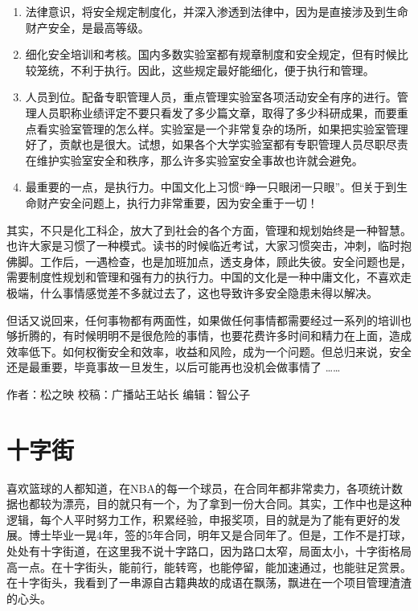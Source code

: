 \documentclass[
]{book}
\begin{document}
\begin{enumerate}
\def\labelenumi{\arabic{enumi}.}
\item
  法律意识，将安全规定制度化，并深入渗透到法律中，因为是直接涉及到生命财产安全，是最高等级。
\item
  细化安全培训和考核。国内多数实验室都有规章制度和安全规定，但有时候比较笼统，不利于执行。因此，这些规定最好能细化，便于执行和管理。
\item
  人员到位。配备专职管理人员，重点管理实验室各项活动安全有序的进行。管理人员职称业绩评定不要只看发了多少篇文章，取得了多少科研成果，而要重点看实验室管理的怎么样。实验室是一个非常复杂的场所，如果把实验室管理好了，贡献也是很大。试想，如果各个大学实验室都有专职管理人员尽职尽责在维护实验室安全和秩序，那么许多实验室安全事故也许就会避免。
\item
  最重要的一点，是执行力。中国文化上习惯``睁一只眼闭一只眼''。但关于到生命财产安全问题上，执行力非常重要，因为安全重于一切！
\end{enumerate}

其实，不只是化工科企，放大了到社会的各个方面，管理和规划始终是一种智慧。也许大家是习惯了一种模式。读书的时候临近考试，大家习惯突击，冲刺，临时抱佛脚。工作后，一遇检查，也是加班加点，透支身体，顾此失彼。安全问题也是，需要制度性规划和管理和强有力的执行力。中国的文化是一种中庸文化，不喜欢走极端，什么事情感觉差不多就过去了，这也导致许多安全隐患未得以解决。

但话又说回来，任何事物都有两面性，如果做任何事情都需要经过一系列的培训也够折腾的，有时候明明不是很危险的事情，也要花费许多时间和精力在上面，造成效率低下。如何权衡安全和效率，收益和风险，成为一个问题。但总归来说，安全还是最重要，毕竟事故一旦发生，以后可能再也没机会做事情了 \ldots\ldots{}

作者：松之映
校稿：广播站王站长
编辑：智公子

\hypertarget{ux5341ux5b57ux8857}{%
\section{十字街}\label{ux5341ux5b57ux8857}}

喜欢篮球的人都知道，在NBA的每一个球员，在合同年都非常卖力，各项统计数据也都较为漂亮，目的就只有一个，为了拿到一份大合同。其实，工作中也是这种逻辑，每个人平时努力工作，积累经验，申报奖项，目的就是为了能有更好的发展。博士毕业一晃4年，签的5年合同，明年又是合同年了。但是，工作不是打球，处处有十字街道，在这里我不说十字路口，因为路口太窄，局面太小，十字街格局高一点。在十字街头，能前行，能转弯，也能停留，能加速通过，也能驻足赏景。在十字街头，我看到了一串源自古籍典故的成语在飘荡，飘进在一个项目管理渣渣的心头。
\end{document}
